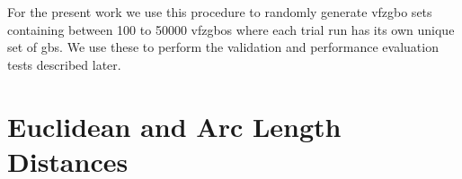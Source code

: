 \documentclass[preprint,12pt]{elsarticle}
\begin{document}
For the present work we use this procedure to randomly generate \gls{vfzgbo} sets containing between \num{100} to \num{50000} \glspl{vfzgbo} where each trial run has its own unique set of \glspl{gb}. We use these to perform the validation and performance evaluation tests described later. %
%
%

\section{Euclidean and Arc Length Distances}
\label{sec:supp:dist-parity}
\end{document}
